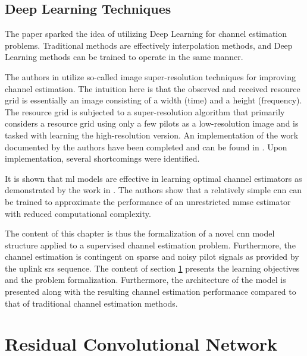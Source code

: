 \subsection{Deep Learning Techniques}
The paper \cite{SoltaniDeepEstimation} sparked the idea of utilizing Deep Learning for channel estimation problems. Traditional methods are effectively interpolation methods, and Deep Learning methods can be trained to operate in the same manner. 

The authors in \cite{SoltaniDeepEstimation} utilize so-called image super-resolution techniques for improving channel estimation. The intuition here is that the observed and received resource grid is essentially an image consisting of a width (time) and a height (frequency). The resource grid is subjected to a super-resolution algorithm that primarily considers a resource grid using only a few pilots as a low-resolution image and is tasked with learning the high-resolution version. An implementation of the work documented by the authors have been completed and can be found in \cite{Thrane2020RepositoryLearning}. Upon implementation, several shortcomings were identified. 

It is shown that \gls{ml} models are effective in learning optimal channel estimators as demonstrated by the work in \cite{Neumann2018LearningEstimator}. The authors show that a relatively simple \gls{cnn} can be trained to approximate the performance of an unrestricted \gls{mmse} estimator with reduced computational complexity.  

The content of this chapter is thus the formalization of a novel \gls{cnn} model structure applied to a supervised channel estimation problem. Furthermore, the channel estimation is contingent on sparse and noisy pilot signals as provided by the uplink \gls{srs} sequence. The content of section \ref{sec:cnn_channel_estimator} presents the learning objectives and the problem formalization.  Furthermore, the architecture of the model is presented along with the resulting channel estimation performance compared to that of traditional channel estimation methods.


\section{Residual Convolutional Network}\label{sec:cnn_channel_estimator}

